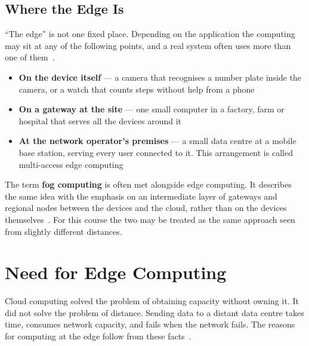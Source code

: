 \documentclass[../main.tex]{subfiles}
\begin{document}
\subsection{Where the Edge Is}

``The edge'' is not one fixed place. Depending on the application the
computing may sit at any of the following points, and a real system often
uses more than one of them~.

\begin{itemize}
  \item \textbf{On the device itself} --- a camera that recognises a number
        plate inside the camera, or a watch that counts steps without help
        from a phone
  \item \textbf{On a gateway at the site} --- one small computer in a
        factory, farm or hospital that serves all the devices around it
  \item \textbf{At the network operator's premises} --- a small data centre
        at a mobile base station, serving every user connected to it. This
        arrangement is called multi-access edge computing~
\end{itemize}

The term \textbf{fog computing} is often met alongside edge computing. It
describes the same idea with the emphasis on an intermediate layer of
gateways and regional nodes between the devices and the cloud, rather than on
the devices themselves~. For this course the two may be treated
as the same approach seen from slightly different distances.

\section{Need for Edge Computing}

Cloud computing solved the problem of obtaining capacity without owning it.
It did not solve the problem of distance. Sending data to a distant data
centre takes time, consumes network capacity, and fails when the network
fails. The reasons for computing at the edge follow from these
facts~.
\end{document}
